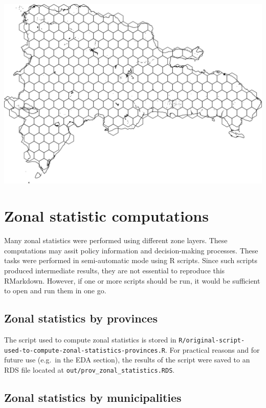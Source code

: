 \documentclass[10pt,landscape,a3paper]{article}
\begin{document}
\begin{center}\includegraphics{img/data-download-preparation-eda/hex-grid-annual-approach-1} \end{center}

\hypertarget{zonal-statistic-computations}{%
\section{Zonal statistic
computations}\label{zonal-statistic-computations}}

Many zonal statistics were performed using different zone layers. These
computations may assit policy information and decision-making processes.
These tasks were performed in semi-automatic mode using R scripts. Since
such scripts produced intermediate results, they are not essential to
reproduce this RMarkdown. However, if one or more scripts should be run,
it would be sufficient to open and run them in one go.

\hypertarget{zonal-statistics-by-provinces}{%
\subsection{Zonal statistics by
provinces}\label{zonal-statistics-by-provinces}}

The script used to compute zonal statistics is stored in
\texttt{R/original-script-used-to-compute-zonal-statistics-provinces.R}.
For practical reasons and for future use (e.g.~in the EDA section), the
results of the script were saved to an RDS file located at
\texttt{out/prov\_zonal\_statistics.RDS}.

\hypertarget{zonal-statistics-by-municipalities}{%
\subsection{Zonal statistics by
municipalities}\label{zonal-statistics-by-municipalities}}
\end{document}
